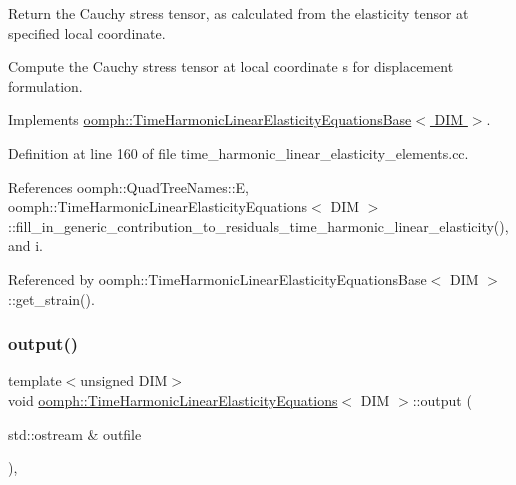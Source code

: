 Return the Cauchy stress tensor, as calculated from the elasticity tensor at specified local coordinate. 

Compute the Cauchy stress tensor at local coordinate s for displacement formulation. 

Implements \hyperlink{classoomph_1_1TimeHarmonicLinearElasticityEquationsBase_a292db17379dfd457f5cc103acc3c5163}{oomph\+::\+Time\+Harmonic\+Linear\+Elasticity\+Equations\+Base$<$ D\+I\+M $>$}.



Definition at line 160 of file time\+\_\+harmonic\+\_\+linear\+\_\+elasticity\+\_\+elements.\+cc.



References oomph\+::\+Quad\+Tree\+Names\+::E, oomph\+::\+Time\+Harmonic\+Linear\+Elasticity\+Equations$<$ D\+I\+M $>$\+::fill\+\_\+in\+\_\+generic\+\_\+contribution\+\_\+to\+\_\+residuals\+\_\+time\+\_\+harmonic\+\_\+linear\+\_\+elasticity(), and i.



Referenced by oomph\+::\+Time\+Harmonic\+Linear\+Elasticity\+Equations\+Base$<$ D\+I\+M $>$\+::get\+\_\+strain().

\mbox{\label{classoomph_1_1TimeHarmonicLinearElasticityEquations_acbc7549f33300563f0a3953782fb4a46}} 
\subsubsection{\texorpdfstring{output()}{output()}\hspace{0.1cm}{\footnotesize\ttfamily [1/4]}}
{\footnotesize\ttfamily template$<$unsigned D\+IM$>$ \\
void \hyperlink{classoomph_1_1TimeHarmonicLinearElasticityEquations}{oomph\+::\+Time\+Harmonic\+Linear\+Elasticity\+Equations}$<$ D\+IM $>$\+::output (\begin{DoxyParamCaption}\item[{std\+::ostream \&}]{outfile }\end{DoxyParamCaption})\hspace{0.3cm}{\ttfamily [inline]}, {\ttfamily [virtual]}}



